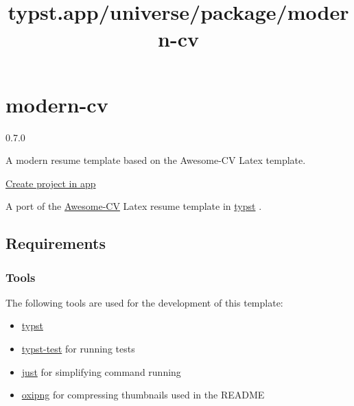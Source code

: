 \title{typst.app/universe/package/modern-cv}

\label{banner}
\label{template-thumbnail}

\section{modern-cv}\label{modern-cv}

{ 0.7.0 }

A modern resume template based on the Awesome-CV Latex template.

\href{/app?template=modern-cv&version=0.7.0}{Create project in app}

\label{readme}
\href{https://github.com/DeveloperPaul123/modern-cv/stargazers}{\pandocbounded{}}
\href{https://discord.gg/CX2ybByRnt}{\pandocbounded{\texttt{[image: https://img.shields.io/discord/652515194572111872?logo=Discord]}}}
\href{https://github.com/DeveloperPaul123/modern-cv/actions/workflows/tests.yml}{\pandocbounded{}}

A port of the \href{https://github.com/posquit0/Awesome-CV}{Awesome-CV}
Latex resume template in \href{https://github.com/typst/typst}{typst} .

\subsection{Requirements}\label{requirements}

\subsubsection{Tools}\label{tools}

The following tools are used for the development of this template:

\begin{itemize}
\tightlist
\item
  \href{https://github.com/typst/typst}{typst}
\item
  \href{https://github.com/tingerrr/typst-test}{typst-test} for running
  tests
\item
  \href{https://github.com/casey/just}{just} for simplifying command
  running
\item
  \href{https://github.com/shssoichiro/oxipng}{oxipng} for compressing
  thumbnails used in the README
\end{itemize}

